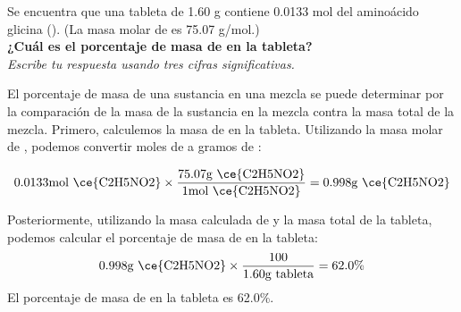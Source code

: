 Se encuentra que una tableta de 1.60 g contiene 0.0133 mol del aminoácido glicina (). (La masa molar de  es 75.07 g/mol.)\\
\textbf{¿Cuál es el porcentaje de masa de  en la tableta?}\\
\emph{Escribe tu respuesta usando tres cifras significativas.}\\
\begin{solutionbox}{6cm}
    El porcentaje de masa de una sustancia en una mezcla se puede determinar por la comparación de la masa de la sustancia en la mezcla contra la masa total de la mezcla.
    Primero, calculemos la masa de  en la tableta. Utilizando la masa molar de , podemos convertir moles de  a gramos de :

    \[0.0133\text{mol \ce{C2H5NO2}} \times \frac{75.07\text{g \ce{C2H5NO2}}}{1\text{mol \ce{C2H5NO2}}} = 0.998 \text{g \ce{C2H5NO2}}\]

    Posteriormente, utilizando la masa calculada de  y la masa total de la tableta, podemos calcular el porcentaje de masa de  en la tableta:
    \[0.998\text{g \ce{C2H5NO2}} \times \frac{100}{1.60\text{g tableta}} = 62.0\%\]
    El porcentaje de masa de  en la tableta es 62.0\%.
\end{solutionbox}